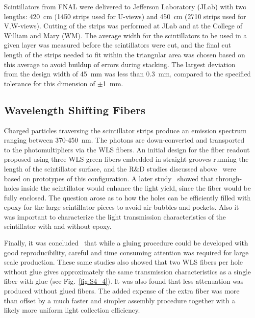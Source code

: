 Scintillators from FNAL were delivered to Jefferson Laboratory (JLab) with two lengths: 420~cm (1450 strips
used for U-views) and 450~cm (2710 strips used for V,W-views). Cutting of the strips was performed at JLab
and at the College of William and Mary (WM). The average width for the scintillators to be used in a given layer
was measured before the scintillators were cut, and the final cut length of the strips needed to fit within the
triangular area was chosen based on this average to avoid buildup of errors during stacking. The largest deviation
from the design width of 45~mm was less than 0.3~mm, compared to the specified tolerance for this dimension
of $\pm$1~mm.

\subsection{Wavelength Shifting Fibers}

Charged particles traversing the scintillator strips produce an emission spectrum ranging between 370-450~nm.
The photons are down-converted and transported to the photomultipliers via the WLS fibers. An initial design
for the fiber readout proposed using three WLS green fibers embedded in straight grooves running the length
of the scintillator surface, and the R$\&$D studies discussed above~\cite{2007007} were based on prototypes of
this configuration. A later study~\cite{2009018} showed that through-holes inside the scintillator would enhance
the light yield, since the fiber would be fully enclosed. The question arose as to how the holes can be efficiently
filled with epoxy for the large scintillator pieces to avoid air bubbles and pockets. Also it was important to
characterize the light transmission characteristics of the scintillator with and without epoxy.

Finally, it was concluded~\cite{2010012} that while a gluing procedure could be developed with good
reproducibility, careful and time consuming attention was required for large scale production. These same studies
also showed that two WLS fibers per hole without glue gives approximately the same transmission characteristics
as a single fiber with glue (see Fig.~\ref{fig:S4_4}). It was also found that less attenuation was produced without
glued fibers. The added expense of the extra fiber was more than offset by a much faster and simpler assembly
procedure together with a likely more uniform light collection efficiency. 


